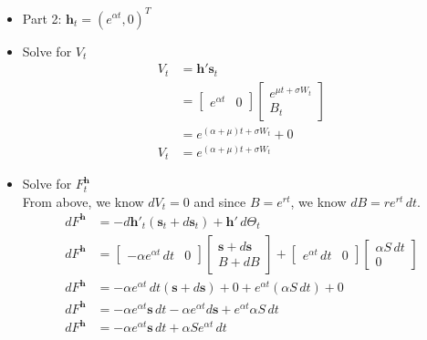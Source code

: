 \documentclass[11pt]{article}
\begin{document}
\begin{itemize}
    \item Part 2: $\boldsymbol{h}_t = {(e^{\alpha t}, 0)}^T$
    \item Solve for $V_t$
    \begin{align*}
        V_t &= \boldsymbol{h}'\boldsymbol{s}_t \\
        &= 
        \begin{bmatrix} e^{\alpha t} & 0 \end{bmatrix}
        \begin{bmatrix}
            e^{\mu t + \sigma W_t} \\ 
            B_t
        \end{bmatrix} \\ 
        &= e^{(\alpha + \mu)t + \sigma W_t} + 0 \\
        V_t &= e^{(\alpha + \mu)t + \sigma W_t}
    \end{align*}
    \item Solve for $F_t^{\boldsymbol{h}}$ \\
    From above, we know $dV_t = 0$ and since $B= e^{rt}$, we know $dB=re^{rt} \,dt$.
    \begin{align*}
        dF^{\boldsymbol{h}} &= -d\boldsymbol{h}'_t(\boldsymbol{s}_t + d\boldsymbol{s}_t) + 
        \boldsymbol{h}'\,d\Theta_t \\
        dF^{\boldsymbol{h}} &= \begin{bmatrix} - \alpha e^{\alpha t} \,dt& 0 \end{bmatrix}
        \begin{bmatrix} \boldsymbol{s} + d\boldsymbol{s} \\ B + dB \end{bmatrix} + 
        \begin{bmatrix} e^{\alpha t} \,dt & 0 \end{bmatrix} \begin{bmatrix} \alpha S\,dt \\ 0 
        \end{bmatrix} \\
        dF^{\boldsymbol{h}} &= - \alpha e^{\alpha t} \,dt (\boldsymbol{s} + d\boldsymbol{s}) + 
        0 + e^{\alpha t} (\alpha S\,dt) + 0 \\
        dF^{\boldsymbol{h}} &= - \alpha e^{\alpha t} \boldsymbol{s} \,dt  - \alpha e^{\alpha t} 
        d\boldsymbol{s} + e^{\alpha t} \alpha S\,dt \\
        dF^{\boldsymbol{h}} &= - \alpha e^{\alpha t} \boldsymbol{s} \,dt  + \alpha S
        e^{\alpha t} \,dt \\ %
    \end{align*} 
\end{itemize}
\end{document}
